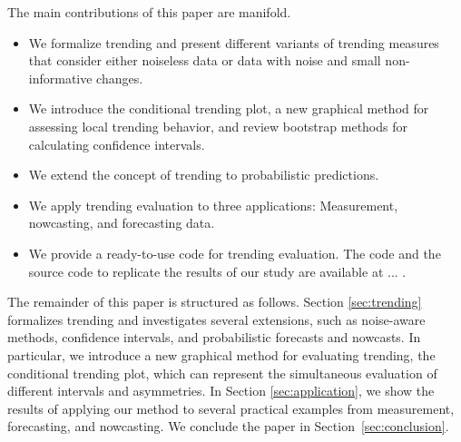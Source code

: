 The main contributions of this paper are manifold.
\begin{itemize}
\item We formalize trending and present different variants of trending measures that consider either noiseless data or data with noise and small non-informative changes.
\item We introduce the conditional trending plot, a new graphical method for assessing local trending behavior, and review bootstrap methods for calculating confidence intervals.
\item We extend the concept of trending to probabilistic predictions.
\item We apply trending evaluation to three applications: Measurement, nowcasting, and forecasting data. 
\item We provide a ready-to-use code for trending evaluation. The code and the source code to replicate the results of our study are available at ... .
\end{itemize}

The remainder of this paper is structured as follows. 
Section \ref{sec:trending} formalizes trending and investigates several extensions, such as noise-aware methods, confidence intervals, and probabilistic forecasts and nowcasts. 
In particular, we introduce a new graphical method for evaluating trending, the conditional trending plot, which can represent the simultaneous evaluation of different intervals and asymmetries. 
In Section \ref{sec:application}, we show the results of applying our method to several practical examples from measurement, forecasting, and nowcasting. 
We conclude the paper in Section~\ref{sec:conclusion}.

